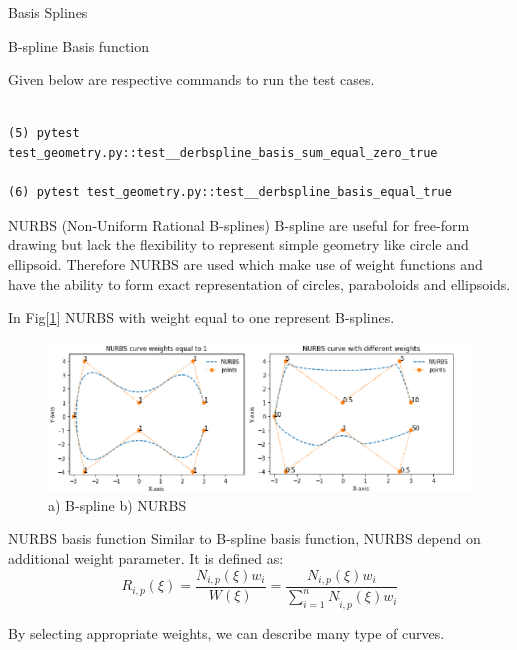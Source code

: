 \documentclass[a4paper,12pt,times]{article}
\begin{document}
\begin{section}{Basis Splines}
\begin{subsection}{B-spline Basis function}
\begin{itemize}
\end{itemize}
Given below are respective commands to run the test cases.
\begin{lstlisting} 

(5) pytest test_geometry.py::test__derbspline_basis_sum_equal_zero_true

(6) pytest test_geometry.py::test__derbspline_basis_equal_true

\end{lstlisting}
\end{subsection}


\end{section}


\begin{section}{NURBS (Non-Uniform Rational B-splines) }
B-spline are useful for free-form drawing but lack the flexibility to represent simple geometry like circle and ellipsoid. Therefore NURBS are used which make use of weight functions and have the ability to form exact representation of circles, paraboloids and ellipsoids.

In Fig[\ref{fig:NURBS and B-splines representation and differance}] NURBS with weight equal to one represent B-splines. 

\begin{figure}[h!]
\centering
\includegraphics[width=\linewidth]{NURBS_combined_bspline.png}
\caption{a) B-spline b) NURBS}
\label{fig:NURBS and B-splines representation and differance}
\end{figure}

\begin{subsection}{NURBS basis function}
Similar to B-spline basis function, NURBS depend on additional weight parameter.
It is defined as:
\begin{equation}\label{NURBS basis function}
R_{i, p}(\xi)=\frac{N_{i, p}(\xi) w_{i}}{W(\xi)}=\frac{N_{i, p}(\xi) w_{i}}{\sum_{i=1}^{n} N_{\hat{i}, p}(\xi) w_{i}}
\end{equation}

By selecting appropriate weights, we can describe many type of curves.  


\end{subsection}
\end{section}
\end{document}
